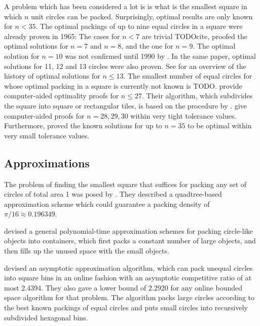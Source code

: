 \documentclass[a4paper,style=print,bibliography=totoc,nexus,lnum,extramargin]{tubsbook}
\begin{document}
A problem which has been considered a lot is is what is the smallest square in which $n$ unit circles can be packed. Surprisingly, optimal results are only known for $n < 35$.
The optimal packings of up to nine equal circles in a square were already proven in 1965: The cases for $n < 7$ are trivial TODOcite,
\textcite{schaer1965densest} proofed the optimal solutions for $n = 7$ and $n = 8$, and \textcite{SM1965geometric} the one for $n = 9$.
The optimal solution for $n = 10$ was not confirmed until 1990 by \textcite{DPW1990optimal}. In the same paper, optimal solutions for 11, 12 and 13 circles were also proven.
See \textcite{WMP1994history} for an overview of the history of optimal solutions for $n \le 13$.
The smallest number of equal circles for whose optimal packing in a square is currently not known is TODO.
\textcite{NO1998more} provide computer-aided optimality proofs for $n \le 27$. Their algorithm, which subdivides the square into square or rectangular tiles, is based on the procedure by \textcite{PWMD1992packing}.
\textcite{MC2005new} give computer-aided proofs for $n=28,29,30$ within very tight tolerance values.
Furthermore, \textcite{LR2002packing} proved the known solutions for up to $n=35$ to be optimal within very small tolerance values.

\subsection{Approximations}

The problem of finding the smallest square that suffices for packing any set of circles of total area 1 was posed by \textcite{DFL2010circle}. They described a quadtree-based approximation scheme which could guarantee a packing density of $\pi/16 \approx 0.196349$.

\textcite{MPSSW2014polynomial} devised a general polynomial-time approximation schemes for packing circle-like objects into containers, which first packs a constant number of large objects, and then fills up the unused space with the small objects.

\textcite{HMS2016bounded} devised an asymptotic approximation algorithm, which can pack unequal circles into square bins in an online fashion with an asymptotic competitive ratio of at most 2.4394. They also gave a lower bound of 2.2920 for any online bounded space algorithm for that problem. The algorithm packs large circles according to the best known packings of equal circles and puts small circles into recursively subdivided hexagonal bins.
\end{document}
